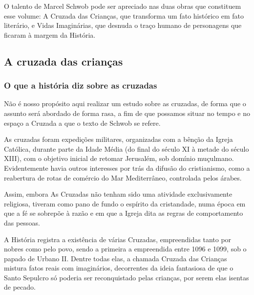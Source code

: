 \documentclass[12pt]{extarticle}
\begin{document}
O talento de Marcel Schwob pode ser apreciado nas duas obras que
constituem esse volume: A Cruzada das Crianças, que transforma um fato
histórico em fato literário, e Vidas Imaginárias, que desnuda o traço
humano de personagens que ficaram à margem da História.

\subsection{A cruzada das crianças}


\subsubsection{O que a história diz sobre as cruzadas}

Não é nosso propósito aqui realizar um estudo sobre as cruzadas, de
forma que o assunto será abordado de forma rasa, a fim de que possamos
situar no tempo e no espaço a Cruzada a que o texto de Schwob se refere.

As cruzadas foram expedições militares, organizadas com a bênção da
Igreja Católica, durante parte da Idade Média (do final do século XI à
metade do século XIII), com o objetivo inicial de retomar Jerusalém, sob
domínio muçulmano. Evidentemente havia outros interesses por trás da
difusão do cristianismo, como a reabertura de rotas de comércio do Mar
Mediterrâneo, controlada pelos árabes.




Assim, embora As Cruzadas não tenham sido uma atividade exclusivamente
religiosa, tiveram como pano de fundo o espírito da cristandade, numa
época em que a fé se sobrepõe à razão e em que a Igreja dita as regras
de comportamento das pessoas.

A História registra a existência de várias Cruzadas, empreendidas tanto
por nobres como pelo povo, sendo a primeira a empreendida entre 1096 e
1099, sob o papado de Urbano II. Dentre todas elas, a chamada Cruzada
das Crianças mistura fatos reais com imaginários, decorrentes da ideia
fantasiosa de que o Santo Sepulcro só poderia ser reconquistado pelas
crianças, por serem elas isentas de pecado.


\end{document}
